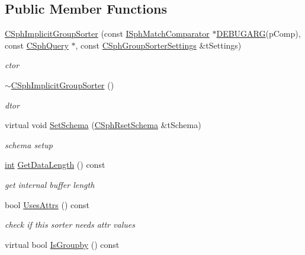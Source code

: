 \subsection*{Public Member Functions}
\begin{DoxyCompactItemize}
\item 
\hyperlink{classCSphImplicitGroupSorter_a58255ca4e8724f2d629e35c295098e72}{C\-Sph\-Implicit\-Group\-Sorter} (const \hyperlink{structISphMatchComparator}{I\-Sph\-Match\-Comparator} $\ast$\hyperlink{sphinxstd_8h_aea24330ad33ca20415a6729b2e46ef2d}{D\-E\-B\-U\-G\-A\-R\-G}(p\-Comp), const \hyperlink{classCSphQuery}{C\-Sph\-Query} $\ast$, const \hyperlink{structCSphGroupSorterSettings}{C\-Sph\-Group\-Sorter\-Settings} \&t\-Settings)
\begin{DoxyCompactList}\small\item\em ctor \end{DoxyCompactList}\item 
\hyperlink{classCSphImplicitGroupSorter_a0777f1760f29bdea61ab722793456d02}{$\sim$\-C\-Sph\-Implicit\-Group\-Sorter} ()
\begin{DoxyCompactList}\small\item\em dtor \end{DoxyCompactList}\item 
virtual void \hyperlink{classCSphImplicitGroupSorter_a16c496aefc8969c081b6b5df3e766a18}{Set\-Schema} (\hyperlink{classCSphRsetSchema}{C\-Sph\-Rset\-Schema} \&t\-Schema)
\begin{DoxyCompactList}\small\item\em schema setup \end{DoxyCompactList}\item 
\hyperlink{sphinxexpr_8cpp_a4a26e8f9cb8b736e0c4cbf4d16de985e}{int} \hyperlink{classCSphImplicitGroupSorter_a4fd98d154a62d860fe57936500c1d31a}{Get\-Data\-Length} () const 
\begin{DoxyCompactList}\small\item\em get internal buffer length \end{DoxyCompactList}\item 
bool \hyperlink{classCSphImplicitGroupSorter_a7a122b393ee3f83749dfa9d9c658081e}{Uses\-Attrs} () const 
\begin{DoxyCompactList}\small\item\em check if this sorter needs attr values \end{DoxyCompactList}\item 
virtual bool \hyperlink{classCSphImplicitGroupSorter_a8ad408447b5a55d1bb55233f84d0ef45}{Is\-Groupby} () const 

\end{DoxyCompactItemize}
